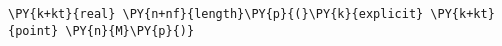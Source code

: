 \begin{Verbatim}[commandchars=\\\{\}]
    \PY{k+kt}{real} \PY{n+nf}{length}\PY{p}{(}\PY{k}{explicit} \PY{k+kt}{point} \PY{n}{M}\PY{p}{)}
\end{Verbatim}

